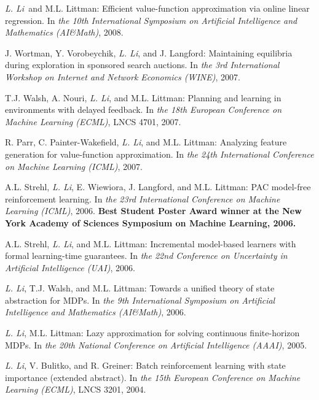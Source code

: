 \documentclass[10pt,twoside,letterpaper]{article}
\newcommand{\selffont}[1]{{\textit{#1}}}
\newcommand{\venuefont}[1]{{\textit{#1}}}
\newcommand{\myself}{\selffont{L. Li}}
\begin{document}
\begin{compactenum}[(C1)]
\item{\myself\ and M.L. Littman: Efficient value-function approximation via online linear regression.  In \venuefont{the 10th International Symposium on Artificial Intelligence and Mathematics (AI\&Math)}, 2008.}

\item{J. Wortman, Y. Vorobeychik, \myself, and J. Langford: Maintaining equilibria during exploration in sponsored search auctions.  In \venuefont{the 3rd International Workshop on Internet and Network Economics (WINE)}, 2007.}

\item{T.J. Walsh, A. Nouri, \myself, and M.L. Littman: Planning and learning in environments with delayed feedback.  In \venuefont{the 18th European Conference on Machine Learning (ECML)}, LNCS 4701, 2007.}

\item{R. Parr, C. Painter-Wakefield, \myself, and M.L. Littman: Analyzing feature generation for value-function approximation.  In \venuefont{the 24th International Conference on Machine Learning (ICML)}, 2007.}

\item{A.L. Strehl, \myself, E. Wiewiora, J. Langford, and M.L. Littman: PAC model-free reinforcement learning.  In \venuefont{the 23rd International Conference on Machine Learning (ICML)}, 2006.  \textbf{Best Student Poster Award winner at the New York Academy of Sciences Symposium on Machine Learning, 2006.}}

\item{A.L. Strehl, \myself, and M.L. Littman: Incremental model-based learners with formal learning-time guarantees.  In \venuefont{the 22nd Conference on Uncertainty in Artificial Intelligence (UAI)}, 2006.}

\item{\myself, T.J. Walsh, and M.L. Littman: Towards a unified theory of state abstraction for MDPs. In \venuefont{the 9th International Symposium on Artificial Intelligence and Mathematics (AI\&Math)}, 2006.}

\item{\myself, M.L. Littman: Lazy approximation for solving continuous finite-horizon MDPs. In \venuefont{the 20th National Conference on Artificial Intelligence (AAAI)}, 2005.}

\item{\myself, V. Bulitko, and R. Greiner: Batch reinforcement learning with state importance (extended abstract).  In \venuefont{the 15th European Conference on Machine Learning (ECML)}, LNCS 3201, 2004.}


\end{compactenum}
\end{document}
